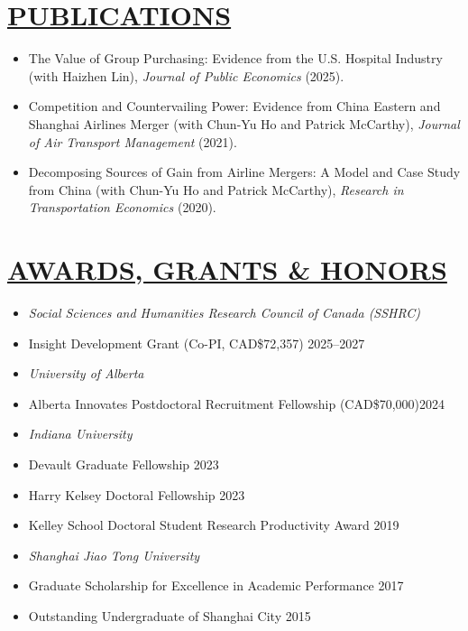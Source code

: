 \documentclass{res}
\begin{document}
\begin{resume}
\section{\large{\ul{PUBLICATIONS}}}
\vspace{1.8em}
\begin{itemize}[leftmargin=15pt,labelindent=-15pt,itemindent=-15pt,itemsep=0.1em]
    \item[] The Value of Group Purchasing: Evidence from the U.S. Hospital Industry (with Haizhen Lin), \textit{Journal of Public Economics} (2025).
    \item[] Competition and Countervailing Power: Evidence from China Eastern and Shanghai Airlines Merger (with Chun-Yu Ho and Patrick McCarthy), \textit{Journal of Air Transport Management} (2021).
    \item[] Decomposing Sources of Gain from Airline Mergers: A Model and Case Study from China (with Chun-Yu Ho and Patrick McCarthy), \textit{Research in Transportation Economics} (2020).
\end{itemize}

\section{\large{\ul{AWARDS, GRANTS \& HONORS}}}
\vspace{1.8em}
\begin{itemize}[leftmargin=15pt,labelindent=-15pt,itemindent=-15pt,itemsep=0.1em]
  \item[] \textit{Social Sciences and Humanities Research Council of Canada (SSHRC)}
      \item[] \hspace{13pt} Insight Development Grant (Co-PI, CAD\$72,357) \hfill 2025--2027
\item[] \textit{University of Alberta}
    \item[] \hspace{13pt} Alberta Innovates Postdoctoral Recruitment Fellowship (CAD\$70,000)\hfill 2024
\item[] \textit{Indiana University}
    \item[] \hspace{13pt} Devault Graduate Fellowship \hfill 2023
    \item[] \hspace{13pt} Harry Kelsey Doctoral Fellowship \hfill 2023
    \item[] \hspace{13pt} Kelley School Doctoral Student Research Productivity Award \hfill 2019
\item[] \textit{Shanghai Jiao Tong University}
    \item[] \hspace{13pt} Graduate Scholarship for Excellence in Academic Performance \hfill 2017
    \item[] \hspace{13pt} Outstanding Undergraduate of Shanghai City \hfill 2015
\end{itemize}


\end{resume}
\end{document}
